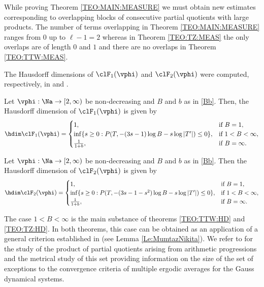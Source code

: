 \documentclass[12pt,a4paper]{amsart}
\begin{document}

\begin{rema01}
While proving Theorem \ref{TEO:MAIN:MEASURE} we must obtain new estimates corresponding to overlapping blocks of consecutive partial quotients with large products. The number of terms overlapping in Theorem \ref{TEO:MAIN:MEASURE} ranges from $0$ up to $\ell-1=2$ whereas in Theorem \ref{TEO:TZ:MEAS} the only overlaps are of length $0$ and $1$ and there are no overlaps in Theorem \ref{TEO:TTW:MEAS}.
\end{rema01}

The Hausdorff dimensions of $\clF_{1}(\vphi)$ and $\clF_{2}(\vphi)$ were computed, respectively, in \cite{TanTianWang2023} and \cite{TanZhou2024}. %

\begin{teo01}\label{TEO:TTW:HD}
Let $\vphi:\Na\to [2,\infty)$ be non-decreasing and $B$ and $b$ as in \eqref{Bb}. Then, the Hausdorff dimension of $\clF_1(\vphi)$ is given by
\[
\hdim \clF_1(\vphi)  
=
\begin{cases}
1, &\text{\rm if } B=1, \\
\inf\{s \geq 0: P(T,-(3s-1)\log B - s \log |T'|) \leq 0\}, &\text{\rm if }  1<B<\infty,\\
\frac{1}{1+b}, &\text{\rm if }  B=\infty.
\end{cases}  
\]
\end{teo01}

\begin{teo01}\label{TEO:TZ:HD}
Let $\vphi:\Na\to [2,\infty)$ be non-decreasing and $B$ and $b$ as in \eqref{Bb}.
Then the Hausdorff dimension of  $\clF_2(\vphi)$ is given by
\[
\hdim \clF_2(\vphi)  
=
\begin{cases}
1, &\text{\rm if }  B=1, \\
\inf\{s \geq 0: P(T,-(3s-1-s^2)\log B - s \log |T'|) \leq 0\}, &\text{\rm if }  1<B<\infty,\\
\frac{1}{1+b}, &\text{\rm if } B=\infty.
\end{cases}  
\]
\end{teo01}
The case $1<B<\infty$ is the main substance of theorems \ref{TEO:TTW:HD} and \ref{TEO:TZ:HD}. In both theorems, this case can be obtained as an application of a general criterion established in \cite{ShulgaHussain2023Exp} (see Lemma \ref{Le:MumtazNikita}). We refer to  \cite{ShulgaHussainPisa} for the study of the product of partial quotients arising from arithmetic progressions and the metrical study of this set providing information on the size of the set of exceptions to the convergence criteria of multiple ergodic averages for the Gauss dynamical systems. 
\end{document}
